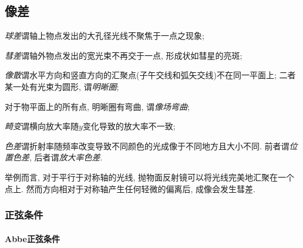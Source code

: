 \documentclass{ctexart}
\begin{document}

\subsection{像差} %
\label{sub:像差}

\begin{cenum}
    \item \emph{球差}谓轴上物点发出的大孔径光线不聚焦于一点之现象;
    \item \emph{彗差}谓轴外物点发出的宽光束不再交于一点, 形成状如彗星的亮斑;
    \item \emph{像散}谓水平方向和竖直方向的汇聚点(子午交线和弧矢交线)不在同一平面上; 二者某一处有光束为圆形, 谓\emph{明晰圈};
    \item 对于物平面上的所有点, 明晰圈有弯曲, 谓\emph{像场弯曲};
    \item \emph{畸变}谓横向放大率随$y$变化导致的放大率不一致;
    \item \emph{色差}谓折射率随频率改变导致不同颜色的光成像于不同地方且大小不同. 前者谓\emph{位置色差}, 后者谓\emph{放大率色差}.
\end{cenum}
\begin{ex}
    举例而言, 对于平行于对称轴的光线, 抛物面反射镜可以将光线完美地汇聚在一个点上. 然而方向相对于对称轴产生任何轻微的偏离后, 成像会发生彗差.
\end{ex}

\subsubsection{正弦条件} %
\label{ssub:正弦条件}

\paragraph{Abbe正弦条件} %
\label{par:abbe正弦条件}
\end{document}
